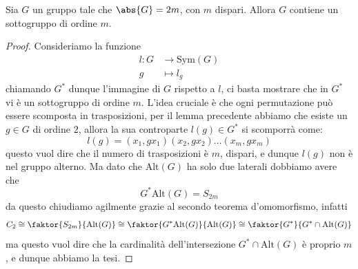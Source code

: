 \documentclass[11pt]{scrartcl}
\begin{document}
	\begin{theorem}
		Sia $G$ un gruppo tale che $\abs{G}=2m$, con $m$ dispari. Allora $G$ contiene un sottogruppo di ordine $m$.
	\end{theorem}
	\begin{proof}
		Consideriamo la funzione 
		\begin{align*}
			l:G& \to \text{Sym}(G) \\
			g &\mapsto l_g 
		\end{align*}
		chiamando $G^*$ dunque l'immagine di $G$ rispetto a $l$, ci basta mostrare che in $G^*$ vi è un sottogruppo di ordine $m$.
		L'idea cruciale è che ogni permutazione può essere scomposta in trasposizioni, per il lemma precedente abbiamo che esiste un $g\in G$ di ordine $2$, allora la sua controparte $l(g)\in G^*$ si scomporrà come:
		$$l(g)=(x_1, gx_1)(x_2, gx_2)\dots (x_m, gx_m)$$
		questo vuol dire che il numero di trasposizioni è $m$, dispari, e dunque $l(g)$ non è nel gruppo alterno. Ma dato che $\text{Alt}(G)$ ha solo due laterali dobbiamo avere che
		$$G^*\text{Alt}(G)=S_{2m}$$
		da questo chiudiamo agilmente grazie al secondo teorema d'omomorfismo, infatti
		$$C_2\cong \faktor{S_{2m}}{\text{Alt}(G)}\cong \faktor{G^*\text{Alt}(G)}{\text{Alt}(G)}\cong \faktor{G^*}{G^*\cap \text{Alt}(G)}$$
		ma questo vuol dire che la cardinalità dell'intersezione $G^*\cap \text{Alt}(G)$ è proprio $m$, e dunque abbiamo la tesi.
	\end{proof}
	
\end{document}
